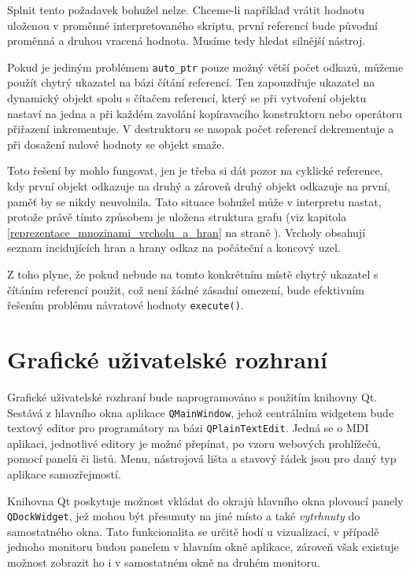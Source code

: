 \documentclass[11pt,twoside,a4paper]{book}
\begin{document}
Splnit tento požadavek bohužel nelze. Chceme-li například vrátit hodnotu uloženou v proměnné interpretovaného skriptu, první referencí bude původní proměnná a druhou vracená hodnota. Musíme tedy hledat silnější nástroj.

Pokud je jediným problémem \texttt{auto\_ptr} pouze možný větší počet odkazů, můžeme použít chytrý ukazatel na bázi čítání referencí. Ten zapouzdřuje ukazatel na dynamický objekt spolu s čítačem referencí, který se při vytvoření objektu nastaví na jedna a při každém zavolání kopíravacího konstruktoru nebo operátoru přiřazení inkrementuje. V destruktoru se naopak počet referencí dekrementuje a při dosažení nulové hodnoty se objekt smaže.

Toto řešení by mohlo fungovat, jen je třeba si dát pozor na cyklické reference, kdy první objekt odkazuje na druhý a zároveň druhý objekt odkazuje na první, paměť by se nikdy neuvolnila. Tato situace bohužel může v interpretu nastat, protože právě tímto způsobem je uložena struktura grafu (viz kapitola \ref{reprezentace_mnozinami_vrcholu_a_hran} na straně \pageref{reprezentace_mnozinami_vrcholu_a_hran}). Vrcholy obsahují seznam incidujících hran a hrany odkaz na počáteční a koncový uzel.

Z toho plyne, že pokud nebude na tomto konkrétním místě chytrý ukazatel s čítáním referencí použit, což není žádné zásadní omezení, bude efektivním řešením problému návratové hodnoty \texttt{execute()}.


\section{Grafické uživatelské rozhraní}

Grafické uživatelské rozhraní bude naprogramováno s použitím knihovny Qt. Sestává z hlavního okna aplikace \texttt{QMainWindow}, jehož centrálním widgetem bude textový editor pro programátory na bázi \texttt{QPlainTextEdit}. Jedná se o MDI aplikaci, jednotlivé editory je možné přepínat, po vzoru webových prohlížečů, pomocí panelů či listů. Menu, nástrojová lišta a stavový řádek jsou pro daný typ aplikace samozřejmostí.

Knihovna Qt poskytuje možnost vkládat do okrajů hlavního okna plovoucí panely \texttt{QDockWidget}, jež mohou být přesunuty na jiné místo a také \textit{vytrhnuty} do samostatného okna. Tato funkcionalita se určitě hodí u vizualizací, v případě jednoho monitoru budou panelem v hlavním okně aplikace, zároveň však existuje možnost zobrazit ho i v samostatném okně na druhém monitoru.
\end{document}
